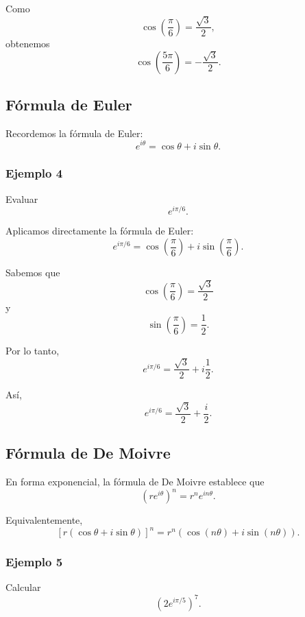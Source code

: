 Como
\[
\cos\left(\frac{\pi}{6}\right)=\frac{\sqrt{3}}{2},
\]
obtenemos
\[
\boxed{
\cos\left(\frac{5\pi}{6}\right)
=
-\frac{\sqrt{3}}{2}
}.
\]

\subsection{Fórmula de Euler}

Recordemos la fórmula de Euler:
\[
\boxed{e^{i\theta}=\cos\theta+i\sin\theta}.
\]

\subsubsection*{Ejemplo 4}

Evaluar
\[
e^{i\pi/6}.
\]

Aplicamos directamente la fórmula de Euler:
\[
e^{i\pi/6}
=
\cos\left(\frac{\pi}{6}\right)
+
i\sin\left(\frac{\pi}{6}\right).
\]

Sabemos que
\[
\cos\left(\frac{\pi}{6}\right)
=
\frac{\sqrt{3}}{2}
\]
y
\[
\sin\left(\frac{\pi}{6}\right)
=
\frac{1}{2}.
\]

Por lo tanto,
\[
e^{i\pi/6}
=
\frac{\sqrt{3}}{2}
+
i\frac{1}{2}.
\]

Así,
\[
\boxed{
e^{i\pi/6}
=
\frac{\sqrt{3}}{2}+\frac{i}{2}
}.
\]

\subsection{Fórmula de De Moivre}

En forma exponencial, la fórmula de De Moivre establece que
\[
\boxed{
\left(re^{i\theta}\right)^n
=
r^n e^{in\theta}
}.
\]

Equivalentemente,
\[
\left[r(\cos\theta+i\sin\theta)\right]^n
=
r^n\left(
\cos(n\theta)+i\sin(n\theta)
\right).
\]

\subsubsection*{Ejemplo 5}

Calcular
\[
\left(2e^{i\pi/5}\right)^7.
\]

